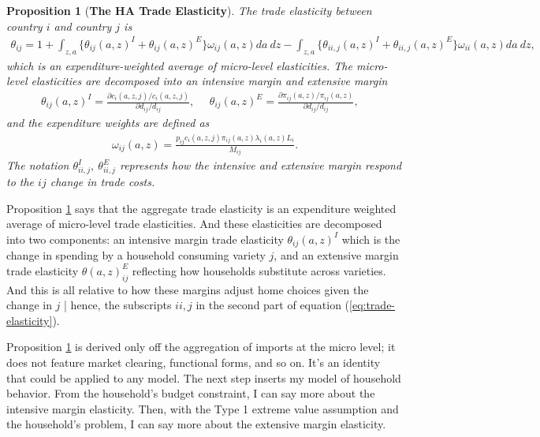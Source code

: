 \documentclass[12pt,pdftex]{article}
\newtheorem{prp}{Proposition}
\begin{document}
\begin{onehalfspacing}
\begin{prp}[\textbf{The HA Trade Elasticity}] \label{prp:GET} The trade elasticity between country $i$ and country $j$ is
{\footnotesize
\begin{align}
\theta_{ij} = 1 + \int_{z,a} \bigg \{ \theta_{ij}(a,z)^{I} + \theta_{ij}(a,z)^{E} \bigg \}\omega_{ij}(a,z)da \ dz - \int_{z,a} \bigg \{ \theta_{ii,j}(a,z)^{I} + \theta_{ii,j}(a,z)^{E} \bigg \}\omega_{ii}(a,z)da \ dz,
\label{eq:trade-elasticity}
\end{align}
}which is an expenditure-weighted average of micro-level elasticities. The micro-level elasticities are decomposed into an intensive margin and extensive margin
{\footnotesize
\begin{align}
\nonumber
\theta_{ij}(a,z)^{I} = \frac{\partial c_{i}(a,z,j)/ c_{i}(a,z,j)}{\partial d_{ij} / d_{ij}}, \ \ \ \ \ \ \theta_{ij}(a,z)^{E} = \frac{\partial \pi_{ij}(a,z) / \pi_{ij}(a,z)}{\partial d_{ij} / d_{ij}}, \ \ \ \
\end{align}
}
and the expenditure weights are defined as
{\footnotesize
\begin{align}
\nonumber
\omega_{ij}(a,z) = \frac{p_{ij}c_{i}(a,z,j)\pi_{ij}(a,z) \lambda_{i}(a,z) L_i}{M_{ij}}.
\end{align}
}
The notation $\theta_{ii,j}^I,  \  \theta_{ii,j}^E $ represents how the intensive and extensive margin respond to the $ij$ change in trade costs.
\end{prp}

Proposition \ref{prp:GET} says that the aggregate trade elasticity is an expenditure weighted average of micro-level trade elasticities. And these elasticities are decomposed into two components: an intensive margin trade elasticity $\theta_{ij}(a,z)^{I}$ which is the change in spending by a household consuming variety $j$, and an extensive margin trade elasticity $\theta(a,z)_{ij}^{E}$ reflecting how households substitute across varieties. And this is all relative to how these margins adjust home choices given the change in $j$ | hence, the subscripts $ii,j$ in the second part of equation (\ref{eq:trade-elasticity}).

Proposition \ref{prp:GET} is derived only off the aggregation of imports at the micro level; it does not feature market clearing, functional forms, and so on. It's an identity that could be applied to any model. The next step inserts my model of household behavior. From the household's budget constraint, I can say more about the intensive margin elasticity. Then, with the Type 1 extreme value assumption and the household's problem, I can say more about the extensive margin elasticity.


\end{onehalfspacing}
\end{document}
